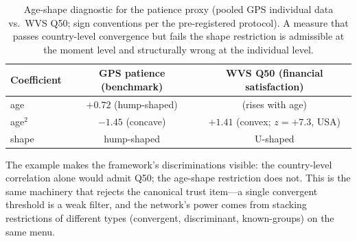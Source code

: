 \documentclass[11pt,letterpaper]{article}
\begin{document}
\begin{table}[h!]
\centering
\caption{Age-shape diagnostic for the patience proxy (pooled GPS individual data vs.\ WVS Q50; sign conventions per the pre-registered protocol). A measure that passes country-level convergence but fails the shape restriction is admissible at the moment level and structurally wrong at the individual level.}
\label{tab:ageshape}
\scriptsize
\begin{tabular}{@{}lcc@{}}
\toprule
\textbf{Coefficient} & \textbf{GPS patience (benchmark)} & \textbf{WVS Q50 (financial satisfaction)} \\
\midrule
age    & $+0.72$ (hump-shaped) & (rises with age) \\
age$^2$ & $-1.45$ (concave)    & $+1.41$ (convex; $z = +7.3$, USA) \\
shape  & hump-shaped           & U-shaped \\
\bottomrule
\end{tabular}
\end{table}

The example makes the framework's discriminations visible: the country-level correlation alone would admit Q50; the age-shape restriction does not. This is the same machinery that rejects the canonical trust item---a single convergent threshold is a weak filter, and the network's power comes from stacking restrictions of different types (convergent, discriminant, known-groups) on the same menu.
\end{document}
